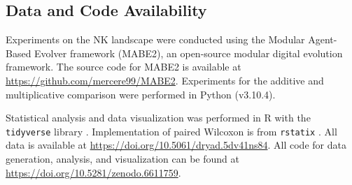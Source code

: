 \subsection{Data and Code Availability}

Experiments on the NK landscape were conducted using the Modular Agent-Based Evolver framework (MABE2), an open-source modular digital evolution framework. The source code for MABE2 is available at \url{https://github.com/mercere99/MABE2}. Experiments for the additive and multiplicative comparison were performed in Python (v3.10.4).

Statistical analysis and data visualization was performed in R \citep{r_core_team_r_2019} with the \texttt{tidyverse} library \citep{wickham_welcome_2019}. Implementation of paired Wilcoxon is from \texttt{rstatix} \citep{kassambara_rstatix_2021}.
All data is available at \url{https://doi.org/10.5061/dryad.5dv41ns84}. 
All code for data generation, analysis, and visualization can be found at \url{https://doi.org/10.5281/zenodo.6611759}.